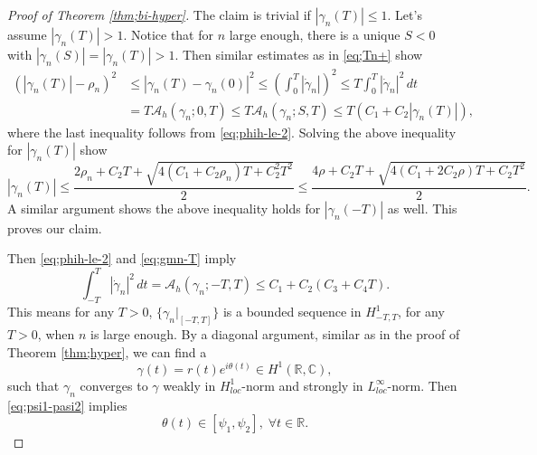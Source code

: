 \documentclass[11pt]{amsart}
\newcommand{\rr}{\mathbb R}
\newcommand{\cc}{\mathbb C}
\newcommand{\A}{\mathcal A}
\newcommand{\gm}{\gamma}
\newcommand{\tht}{\theta}
\theoremstyle{plain}
\theoremstyle{definition}
\theoremstyle{remark}
\begin{document}
\begin{proof}[Proof of Theorem \ref{thm;bi-hyper}]
The claim is trivial if $|\gm_n(T)| \le 1$. Let's assume $|\gm_n(T)| >1$. Notice that for $n$ large enough, there is a unique $S <0$ with $|\gm_n(S)| = |\gm_n(T)|>1$. Then similar estimates as in \eqref{eq;Tn+} show 
\begin{equation}
 \begin{aligned}
 (|\gm_n(T)|- \rho_n)^2 & \le |\gm_n(T)- \gm_n(0)|^2 \le \left( \int_0^T |\dot{\gm}_n| \right)^2 \le T \int_0^T |\dot{\gm}_n|^2 \,dt \\
 & = T \A_h(\gm_n; 0, T) \le T \A_h(\gm_n; S, T) \le T(C_1 + C_2 |\gm_n(T)|),
 \end{aligned}
 \end{equation} 
where the last inequality follows from \eqref{eq;phih-le-2}. Solving the above inequality for $|\gm_n(T)|$ show
 $$  |\gm_n(T)| \le \frac{2 \rho_n + C_2 T + \sqrt{4(C_ 1 + C_2 \rho_n) T + C_2^2 T^2}}{2} \le \frac{4\rho + C_2 T + \sqrt{4(C_1 +2C_2 \rho)T + C_2 T^2}}{2}. 
 $$
A similar argument shows the above inequality holds for $|\gm_n(-T)|$ as well. This proves our claim. 

Then \eqref{eq;phih-le-2} and  \eqref{eq;gmn-T} imply 
 $$ \int_{-T}^T |\dot{\gm}_n|^2 \,dt = \A_h(\gm_n; -T, T) \le C_1 +C_2(C_3 +C_4 T). $$
This means for any $T>0$, $\{\gm_n|_{[-T, T]}\}$ is a bounded sequence in $H^1_{-T, T}$, for any $T>0$, when $n$ is large enough. By a diagonal argument, similar as in the proof of Theorem \ref{thm;hyper}, we can find a 
$$ \gm(t) = r(t)e^{i\tht(t)} \in H^1(\rr, \cc),$$
such that $\gm_n$ converges to $\gm$ weakly in $H^1_{loc}$-norm and strongly in $L^{\infty}_{loc}$-norm. Then \eqref{eq;psi1-pasi2} implies 
\begin{equation}
\label{eq;psi1-psi2-tht} \tht(t) \in [\psi_1, \psi_2], \; \forall t \in \rr. 
\end{equation}



\end{proof}
\end{document}
